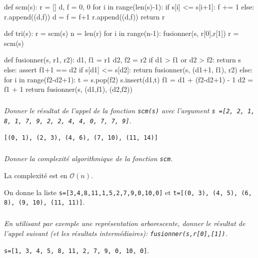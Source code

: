 \documentclass[10pt,fleqn]{article} %
\begin{document}
\begin{py}
\begin{minipage}[c]{.45\linewidth}

\begin{python}
def scm(s):
    r = []
    d, f = 0, 0
    for i in range(len(s)-1):
        if s[i] <= s[i+1]:
            f += 1
        else:
            r.append((d,f))
            d = f = f+1
    r.append((d,f))
    return r
    
def tri(s):
    r = scm(s)
    n = len(r)
    for i in range(n-1):
        fusionner(s, r[0],r[1])
        r = scm(s)
\end{python}

\end{minipage} \hfill
\begin{minipage}[c]{.45\linewidth}

\begin{python}
def fusionner(s, r1, r2):
    d1, f1 = r1
    d2, f2 = r2
    if d1 > f1 or d2 > f2:
        return s
    else:
        assert f1+1 == d2
        if s[d1] <= s[d2]:
            return fusionner(s, (d1+1, f1), r2)
        else:
            for i in range(f2-d2+1):
                t = s.pop(f2) 
                s.insert(d1,t) 
            f1 = d1 + (f2-d2+1) - 1
            d2 = f1 + 1
            return fusionner(s, (d1,f1), (d2,f2))
\end{python}
\end{minipage}
\end{py}
\subparagraph{}
\textit{Donner le résultat de l'appel de la fonction \texttt{scm(s)} avec l'argument \texttt{s =[2, 2, 1, 8, 1, 7, 9, 2, 2, 4, 4, 0, 7, 7, 9]}.}
\ifprof
\begin{corrige}
\texttt{[(0, 1), (2, 3), (4, 6), (7, 10), (11, 14)]}
\end{corrige}
\else
\fi
\subparagraph{}
\textit{Donner la complexité algorithmique de la fonction \texttt{scm}.}
\ifprof
\begin{corrige}
La complexité est en $\mathcal{O}(n)$.
\end{corrige}
\else
\fi

\vspace{.5cm}
On donne la liste \texttt{s=[3,4,8,11,1,5,2,7,9,0,10,0]} et \texttt{t=[(0, 3), (4, 5), (6, 8), (9, 10), (11, 11)]}.
\subparagraph{}
\textit{En utilisant par exemple une représentation arborescente, donner le résultat de l'appel suivant (et les résultats intermédiaires):  \texttt{fusionner(s,r[0],[1])}.}
\ifprof
\begin{corrige}
\texttt{s=[1, 3, 4, 5, 8, 11, 2, 7, 9, 0, 10, 0]}.

\end{corrige}
\else
\fi
\end{document}
